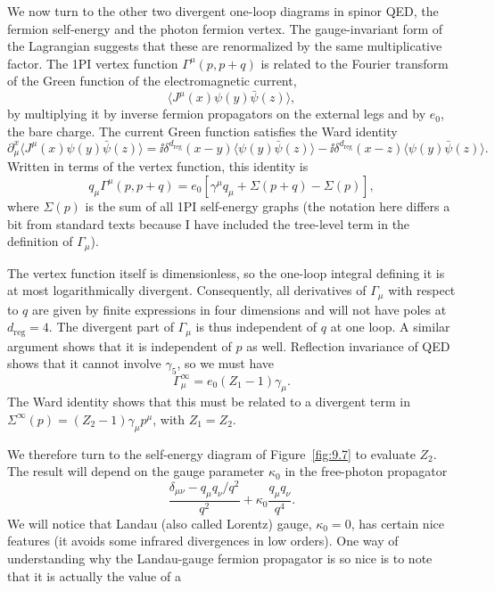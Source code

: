 We now turn to the other two divergent one-loop diagrams in spinor QED, the
fermion self-energy and the photon fermion vertex. The gauge-invariant form of
the Lagrangian suggests that these are renormalized by the same multiplicative
factor. The 1PI vertex function $\Gamma^\mu(p,p+q)$ is related to the Fourier
transform of the Green function of the electromagnetic current,
\[
  \langle J^\mu(x)\psi(y)\bar\psi(z)\rangle,
\]
by multiplying it by inverse fermion propagators on the external legs and by
$e_0$, the bare charge. The current Green function satisfies the Ward identity
\[
  \partial_\mu^x\langle J^\mu(x)\psi(y)\bar\psi(z)\rangle
  =\ii\delta^{d_{\mathrm{reg}}}(x-y)\langle\psi(y)\bar\psi(z)\rangle
  -\ii\delta^{d_{\mathrm{reg}}}(x-z)\langle\psi(y)\bar\psi(z)\rangle.
\]
Written in terms of the vertex function, this identity is
\[
  q_\mu\Gamma^\mu(p,p+q)=e_0\left[\gamma^\mu q_\mu
  +\Sigma(p+q)-\Sigma(p)\right],
\]
where $\Sigma(p)$ is the sum of all 1PI self-energy graphs (the notation here
differs a bit from standard texts because I have included the tree-level term in
the definition of $\Gamma_\mu$).

The vertex function itself is dimensionless, so the one-loop integral defining it
is at most logarithmically divergent. Consequently, all derivatives of
$\Gamma_\mu$ with respect to $q$ are given by finite expressions in four
dimensions and will not have poles at $d_{\mathrm{reg}}=4$. The divergent part of
$\Gamma_\mu$
is thus independent of $q$ at one loop. A similar argument shows that it is
independent of $p$ as well. Reflection invariance of QED shows that it cannot
involve $\gamma_5$, so we must have
\[
  \Gamma^\infty_\mu=e_0(Z_1-1)\gamma_\mu.
\]
The Ward identity shows that this must be related to a divergent term in
$\Sigma^\infty(p)=(Z_2-1)\gamma_\mu p^\mu$, with $Z_1=Z_2$.

We therefore turn to the self-energy diagram of Figure~\ref{fig:9.7} to evaluate $Z_2$.
The result will depend on the gauge parameter $\kappa_0$ in the free-photon
propagator
\[
  \frac{\delta_{\mu\nu}-q_\mu q_\nu/q^2}{q^2}
  +\kappa_0\frac{q_\mu q_\nu}{q^4}.
\]
We will notice that Landau (also called Lorentz) gauge, $\kappa_0=0$, has
certain nice features (it avoids some infrared divergences in low orders). One
way of understanding why the Landau-gauge fermion propagator is so nice is to
note that it is actually the value of a

